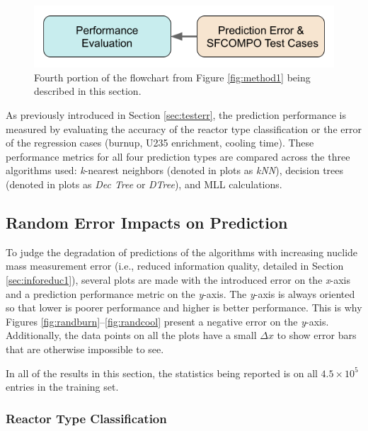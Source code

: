 
\begin{figure}[H]
  \centering
  \includegraphics[width=0.7\linewidth]{./chapters/exp1/methodology1_4.png}
  \caption[Fourth portion of the flowchart from Figure \ref{fig:method1}]
          {Fourth portion of the flowchart from Figure \ref{fig:method1} being 
           described in this section.}
\end{figure}

As previously introduced in Section \ref{sec:testerr}, the prediction
performance is measured by evaluating the accuracy of the reactor type
classification or the error of the regression cases (burnup, \gls{U235}
enrichment, cooling time).  These performance metrics for all four prediction
types are compared across the three algorithms used: \textit{k}-nearest
neighbors (denoted in plots as \textit{kNN}), decision trees (denoted in plots
as \textit{Dec Tree} or \textit{DTree}), and \gls{MLL} calculations.  

\subsection{Random Error Impacts on Prediction}
\label{sec:randerr}

To judge the degradation of predictions of the algorithms with increasing
nuclide mass measurement error (i.e., reduced information quality, detailed in
Section \ref{sec:inforeduc1}), several plots are made with the introduced error
on the \textit{x}-axis and a prediction performance metric on the
\textit{y}-axis.  The \textit{y}-axis is always oriented so that lower is
poorer performance and higher is better performance. This is why Figures
\ref{fig:randburn}--\ref{fig:randcool} present a negative error on the
\textit{y}-axis. Additionally, the data points on all the plots have a small
$\Delta x$ to show error bars that are otherwise impossible to see.

In all of the results in this section, the statistics being reported is on all
$4.5 \times 10^5$ entries in the training set.

\subsubsection{Reactor Type Classification}
\label{sec:randerrA}

